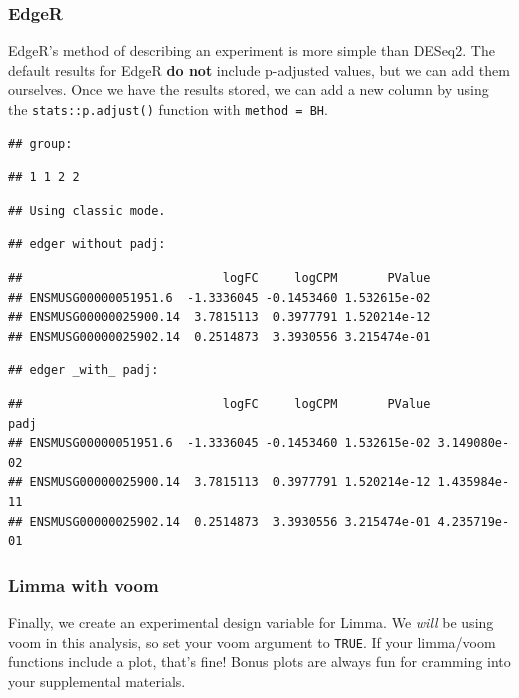 \documentclass[
]{article}
\begin{document}
\subsubsection{EdgeR}\label{edger}

EdgeR's method of describing an experiment is more simple than DESeq2.
The default results for EdgeR \textbf{do not} include p-adjusted values,
but we can add them ourselves. Once we have the results stored, we can
add a new column by using the \texttt{stats::p.adjust()} function with
\texttt{method\ =\ \textquotesingle{}BH\textquotesingle{}}.

\begin{verbatim}
## group:
\end{verbatim}

\begin{verbatim}
## 1 1 2 2
\end{verbatim}

\begin{verbatim}
## Using classic mode.
\end{verbatim}

\begin{verbatim}
## edger without padj:
\end{verbatim}

\begin{verbatim}
##                            logFC     logCPM       PValue
## ENSMUSG00000051951.6  -1.3336045 -0.1453460 1.532615e-02
## ENSMUSG00000025900.14  3.7815113  0.3977791 1.520214e-12
## ENSMUSG00000025902.14  0.2514873  3.3930556 3.215474e-01
\end{verbatim}

\begin{verbatim}
## edger _with_ padj:
\end{verbatim}

\begin{verbatim}
##                            logFC     logCPM       PValue         padj
## ENSMUSG00000051951.6  -1.3336045 -0.1453460 1.532615e-02 3.149080e-02
## ENSMUSG00000025900.14  3.7815113  0.3977791 1.520214e-12 1.435984e-11
## ENSMUSG00000025902.14  0.2514873  3.3930556 3.215474e-01 4.235719e-01
\end{verbatim}

\subsubsection{Limma with voom}\label{limma-with-voom}

Finally, we create an experimental design variable for Limma. We
\emph{will} be using voom in this analysis, so set your voom argument to
\texttt{TRUE}. If your limma/voom functions include a plot, that's fine!
Bonus plots are always fun for cramming into your supplemental
materials.
\end{document}
